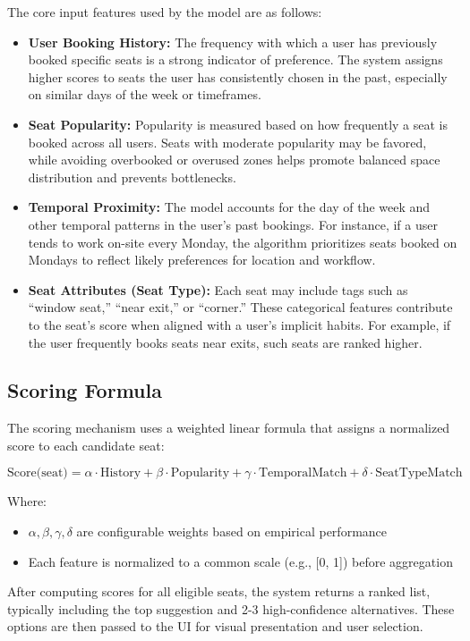 \documentclass[12pt,a4paper]{report}
\begin{document}
The core input features used by the model are as follows:

\begin{itemize}
\item \textbf{User Booking History:}
The frequency with which a user has previously booked specific seats is a strong indicator of preference. The system assigns higher scores to seats the user has consistently chosen in the past, especially on similar days of the week or timeframes.
\item \textbf{Seat Popularity:}  
Popularity is measured based on how frequently a seat is booked across all users. Seats with moderate popularity may be favored, while avoiding overbooked or overused zones helps promote balanced space distribution and prevents bottlenecks.
\item \textbf{Temporal Proximity:}  
The model accounts for the day of the week and other temporal patterns in the user's past bookings. For instance, if a user tends to work on-site every Monday, the algorithm prioritizes seats booked on Mondays to reflect likely preferences for location and workflow.
\item \textbf{Seat Attributes (Seat Type):}  
Each seat may include tags such as “window seat,” “near exit,” or “corner.” These categorical features contribute to the seat's score when aligned with a user's implicit habits. For example, if the user frequently books seats near exits, such seats are ranked higher.
\end{itemize}

\subsection*{Scoring Formula}

The scoring mechanism uses a weighted linear formula that assigns a normalized score to each candidate seat:

\(\text{Score(seat)} = \alpha \cdot \text{History} + \beta \cdot \text{Popularity} + \gamma \cdot \text{TemporalMatch} + \delta \cdot \text{SeatTypeMatch}\)

Where:
\begin{itemize}
\item $\alpha, \beta, \gamma, \delta$ are configurable weights based on empirical performance
\item Each feature is normalized to a common scale (e.g., [0, 1]) before aggregation
\end{itemize}

After computing scores for all eligible seats, the system returns a ranked list, typically including the top suggestion and 2-3 high-confidence alternatives. These options are then passed to the UI for visual presentation and user selection.
\end{document}
